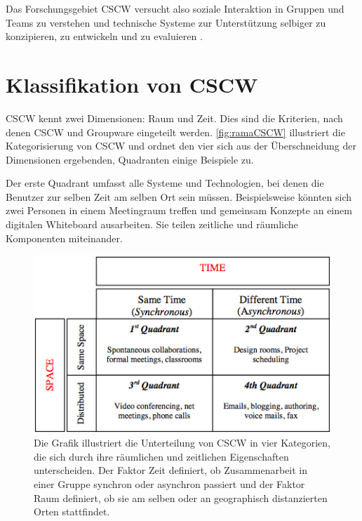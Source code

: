 	Das Forschungsgebiet \ac{CSCW} versucht also soziale Interaktion in Gruppen und Teams zu verstehen und technische Systeme zur Unterstützung selbiger zu konzipieren, zu entwickeln und zu evaluieren \citep{Koch2008}.

\section{Klassifikation von CSCW} 

\ac{CSCW} kennt zwei Dimensionen: Raum und Zeit. Dies sind die Kriterien, nach denen \ac{CSCW} und Groupware eingeteilt werden. \autoref{fig:ramaCSCW} illustriert die Kategorisierung von \ac{CSCW} und ordnet den vier sich aus der Überschneidung der Dimensionen ergebenden, Quadranten einige Beispiele zu. 

Der erste Quadrant umfasst alle Systeme und Technologien, bei denen die Benutzer zur selben Zeit am selben Ort sein müssen. Beispielsweise könnten sich zwei Personen in einem Meetingraum treffen und gemeinsam Konzepte an einem digitalen Whiteboard ausarbeiten. Sie teilen zeitliche und räumliche Komponenten miteinander. 

\begin{figure}
	\includegraphics[width=\textwidth]{gfx/ramaCSCWQuadranten.png}
	\caption[CSCW-Kategorien \newline \citep{Rama:2006p245}]{Die Grafik illustriert die Unterteilung von CSCW in vier Kategorien, die sich durch ihre räumlichen und zeitlichen Eigenschaften unterscheiden. Der Faktor Zeit definiert, ob Zusammenarbeit in einer Gruppe synchron oder asynchron passiert und der Faktor Raum definiert, ob sie am selben oder an geographisch distanzierten Orten stattfindet.}
	\label{fig:ramaCSCW}
\end{figure}

